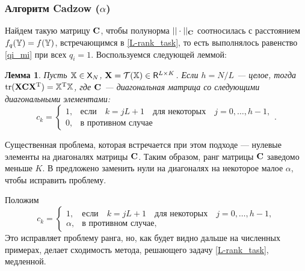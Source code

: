 \documentclass[12pt,a4paper,fleqn,leqno]{article}
\DeclareMathOperator{\tr}{tr}
\begin{document}
\subsubsection{Алгоритм Cadzow ($\alpha$)}
\label{sec:cadzow_alpha}
Найдем такую матрицу $\mathbf{C}$, чтобы полунорма $||\cdot||_{\mathbf{C}}$ соотносилась с расстоянием $f_q(\mathbb{Y}) = f(\mathbb{Y})$, встречающимся в \eqref{L-rank_task}, то есть выполнялось равенство \eqref{qi_mi} при всех $q_i = 1$. Воспользуемся следующей леммой:
\newtheorem{lemma}{Лемма}
\begin{lemma}\label{zhiglemma}\cite{Gillard2014}
Пусть $\mathbb{X} \in \mathsf{X}_N$, $\mathbf{X} = \mathcal{T}(\mathbb{X}) \in \mathsf{R}^{L \times K}$. Если $h = N/L$ --- целое, тогда $\tr(\bfX \bfC \bfX^\rmT) = \tsX^\rmT \tsX$, где $\mathbf{C}$ --- диагональная матрица со следующими диагональными элементами:
\begin{equation*}
c_k = \begin{cases}
1, & \text{если} \quad k = jL+1 \quad \text{для некоторых} \quad j = 0, \ldots, h-1, \\
0, & \text{в противном случае}
\end{cases}.
\end{equation*}
\end{lemma}

Существенная проблема, которая встречается при этом подходе --- нулевые элементы на диагоналях матрицы $\mathbf{C}$. Таким образом, ранг матрицы $\mathbf{C}$ заведомо меньше $K$. В \cite{Gillard2014} предложено заменить нули на диагоналях на некоторое малое $\alpha$, чтобы исправить проблему. 

Положим
\begin{equation}\label{zhigweights}
c_k = \begin{cases}
1, & \text{если} \quad k = jL+1 \quad \text{для некоторых} \quad j = 0, \ldots, h-1, \\
\alpha, & \text{в противном случае,}
\end{cases}
\end{equation}
Это исправляет проблему ранга, но, как будет видно дальше на численных примерах, делает сходимость метода, решающего задачу \eqref{L-rank_task}, медленной.
\end{document}
